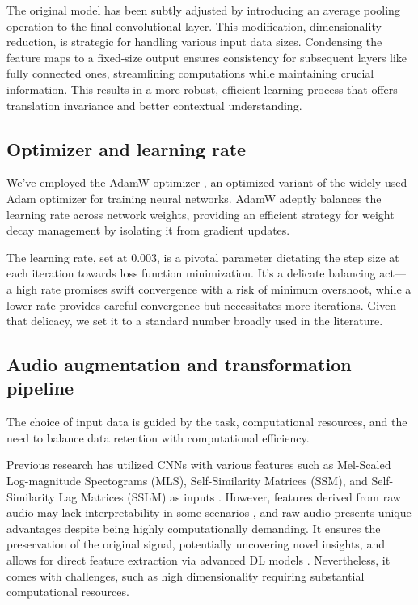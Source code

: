 The original model has been subtly adjusted by introducing an average pooling operation to the final convolutional layer. This modification, dimensionality reduction, is strategic for handling various input data sizes. Condensing the feature maps to a fixed-size output ensures consistency for subsequent layers like fully connected ones, streamlining computations while maintaining crucial information. This results in a more robust, efficient learning process that offers translation invariance and better contextual understanding.

\subsection{Optimizer and learning rate}

We've employed the AdamW optimizer \cite{Loshchilov2017DecoupledRegularization}, an optimized variant of the widely-used Adam optimizer for training neural networks. AdamW adeptly balances the learning rate across network weights, providing an efficient strategy for weight decay management by isolating it from gradient updates. 

The learning rate, set at 0.003, is a pivotal parameter dictating the step size at each iteration towards loss function minimization. It's a delicate balancing act— a high rate promises swift convergence with a risk of minimum overshoot, while a lower rate provides careful convergence but necessitates more iterations. Given that delicacy, we set it to a standard number broadly used in the literature.

\subsection{Audio augmentation and transformation pipeline}

The choice of input data is guided by the task, computational resources, and the need to balance data retention with computational efficiency.

Previous research has utilized CNNs with various features such as Mel-Scaled Log-magnitude Spectograms (MLS), Self-Similarity Matrices (SSM), and Self-Similarity Lag Matrices (SSLM) as inputs \cite{Hernandez-Olivan2021MusicFeatures}. However, features derived from raw audio may lack interpretability in some scenarios \cite{Schindler2020DeepTutorial}, and raw audio presents unique advantages despite being highly computationally demanding. It ensures the preservation of the original signal, potentially uncovering novel insights, and allows for direct feature extraction via advanced DL models \cite{learning, verydeep}. Nevertheless, it comes with challenges, such as high dimensionality requiring substantial computational resources. 

